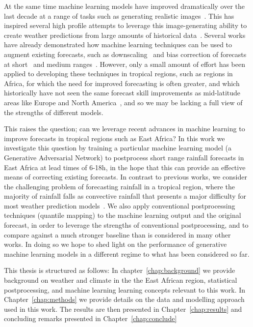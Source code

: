 \documentclass[../main.tex]{subfiles}
\begin{document}
At the same time machine learning models have improved dramatically over the last decade at a range of tasks such as generating realistic images~\citep{karras_style-based_2019}. This has inspired several high profile attempts to leverage this image-generating ability to create weather predictions from large amounts of historical data~\citep{nguyen_climax_2023, bi_pangu-weather_2022,ravuri_skilful_2021, zhang_skilful_2023,lam_graphcast_2022}. Several works have already demonstrated how machine learning techniques can be used to augment existing forecasts, such as downscaling~\citep{harris_generative_2022, leinonen_latent_2023} and bias correction of forecasts at short~\citep{rasp_neural_2018} and medium ranges~\citep{ben-bouallegue_improving_2023}. However, only a small amount of effort has been applied to developing these techniques in tropical regions, such as regions in Africa, for which the need for improved forecasting is often greater, and which historically have not seen the same forecast skill improvements as mid-latitude areas like Europe and North America~\citep{youds_gcrf_2021}, and so we may be lacking a full view of the strengths of different models.

This raises the question; can we leverage recent advances in machine learning to improve forecasts in tropical regions such as East Africa? In this work we investigate this question by training a particular machine learning model (a Generative Adversarial Network) to postprocess short range rainfall forecasts in East Africa at lead times of 6-18h, in the hope that this can provide an effective means of correcting existing forecasts. In contrast to previous works, we consider the challenging problem of forecasting rainfall in a tropical region, where the majority of rainfall falls as convective rainfall that presents a major difficulty for most weather prediction models~\citep{reynolds_wgne_2018}. We also apply conventional postprocessing techniques (quantile mapping) to the machine learning output and the original forecast, in order to leverage the strengths of conventional postprocessing, and to compare against a much stronger baseline than is considered in many other works. In doing so we hope to shed light on the performance of generative machine learning models in a different regime to what has been considered so far.

This thesis is structured as follows: In chapter~\ref{chap:background} we provide background on weather and climate in the the East African region, statistical postprocessing, and machine learning learning concepts relevant to this work. In Chapter~\ref{chap:methods} we provide details on the data and modelling approach used in this work. The results are then presented in Chapter~\ref{chap:results} and concluding remarks presented in Chapter~\ref{chap:conclude}
\end{document}
